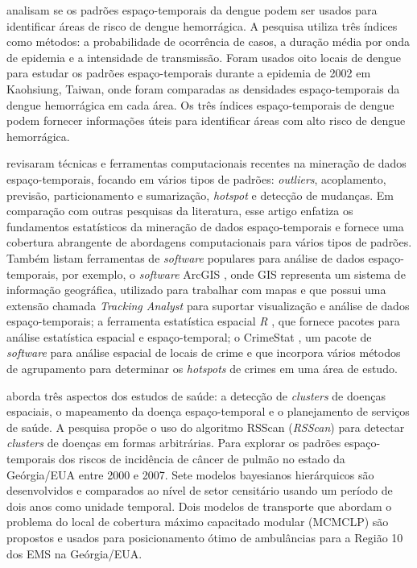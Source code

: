 analisam se os padrões espaço-temporais da dengue podem ser usados para identificar áreas de risco de dengue hemorrágica.
A pesquisa utiliza três índices como métodos: a probabilidade de ocorrência de casos, a duração média por onda de epidemia e a intensidade de transmissão. Foram usados oito locais de dengue para estudar os padrões espaço-temporais durante a epidemia de 2002 em Kaohsiung, Taiwan, onde foram comparadas as densidades espaço-temporais da dengue hemorrágica em cada área. Os três índices espaço-temporais de dengue podem fornecer informações úteis para identificar áreas com alto risco de dengue hemorrágica.

 revisaram técnicas e ferramentas computacionais recentes na mineração de dados espaço-temporais, focando em vários tipos de padrões: \textit{outliers}, acoplamento, previsão, particionamento e sumarização, \textit{hotspot} e detecção de mudanças. Em comparação com outras pesquisas da literatura, esse artigo enfatiza os fundamentos estatísticos da mineração de dados espaço-temporais e fornece uma cobertura abrangente de abordagens computacionais para vários tipos de padrões. Também listam ferramentas de \textit{software} populares para análise de dados espaço-temporais, por exemplo, o \textit{software} ArcGIS \cite{ArcGIS}, onde \acrshort{GIS} representa um sistema de informação geográfica, utilizado para trabalhar com mapas e que possui uma extensão chamada \emph{Tracking Analyst} para suportar visualização e análise de dados espaço-temporais; a ferramenta estatística espacial \emph{R} \cite{R}, que fornece pacotes para análise estatística espacial e espaço-temporal; o CrimeStat \cite{Levine2017CrimeStat}, um pacote de \textit{software} para análise espacial de locais de crime e que incorpora vários métodos de agrupamento para determinar os \emph{hotspots} de crimes em uma área de estudo.


 aborda três aspectos dos estudos de saúde: a detecção de \textit{clusters} de doenças espaciais, o mapeamento da doença espaço-temporal e o planejamento de serviços de saúde. A pesquisa propõe o uso do algoritmo \acrshort{RSScan} (\emph{\acrlong{RSScan}}) para detectar \textit{clusters} de doenças em formas arbitrárias. Para explorar os padrões espaço-temporais dos riscos de incidência de câncer de pulmão no estado da Geórgia/EUA entre 2000 e 2007. Sete modelos bayesianos hierárquicos são desenvolvidos e comparados ao nível de setor censitário usando um período de dois anos como unidade temporal. Dois modelos de transporte que abordam o problema do local de cobertura máximo capacitado modular (\acrshort{MCMCLP}) são propostos e usados para posicionamento ótimo de ambulâncias para a Região 10 dos \acrfull{EMS} na Geórgia/EUA.

